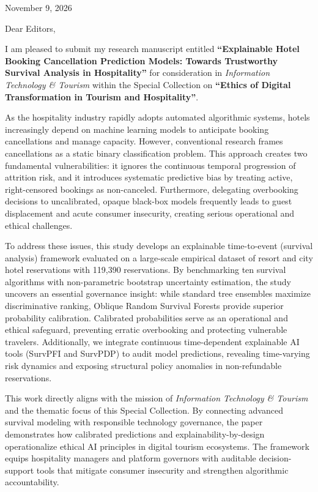 \documentclass[11pt,a4paper]{article}
\begin{document}
\begin{flushright}
    November 9, 2026
\end{flushright}

\vspace{0.3cm}

Dear Editors,

I am pleased to submit my research manuscript entitled \textbf{``Explainable Hotel Booking Cancellation Prediction Models: Towards Trustworthy Survival Analysis in Hospitality''} for consideration in \textit{Information Technology \& Tourism} within the Special Collection on \textbf{``Ethics of Digital Transformation in Tourism and Hospitality''}.

As the hospitality industry rapidly adopts automated algorithmic systems, hotels increasingly depend on machine learning models to anticipate booking cancellations and manage capacity. However, conventional research frames cancellations as a static binary classification problem. This approach creates two fundamental vulnerabilities: it ignores the continuous temporal progression of attrition risk, and it introduces systematic predictive bias by treating active, right-censored bookings as non-canceled. Furthermore, delegating overbooking decisions to uncalibrated, opaque black-box models frequently leads to guest displacement and acute consumer insecurity, creating serious operational and ethical challenges.

To address these issues, this study develops an explainable time-to-event (survival analysis) framework evaluated on a large-scale empirical dataset of resort and city hotel reservations with 119{,}390 reservations. By benchmarking ten survival algorithms with non-parametric bootstrap uncertainty estimation, the study uncovers an essential governance insight: while standard tree ensembles maximize discriminative ranking, Oblique Random Survival Forests provide superior probability calibration. Calibrated probabilities serve as an operational and ethical safeguard, preventing erratic overbooking and protecting vulnerable travelers. Additionally, we integrate continuous time-dependent explainable AI tools (SurvPFI and SurvPDP) to audit model predictions, revealing time-varying risk dynamics and exposing structural policy anomalies in non-refundable reservations.

This work directly aligns with the mission of \textit{Information Technology \& Tourism} and the thematic focus of this Special Collection. By connecting advanced survival modeling with responsible technology governance, the paper demonstrates how calibrated predictions and explainability-by-design operationalize ethical AI principles in digital tourism ecosystems. The framework equips hospitality managers and platform governors with auditable decision-support tools that mitigate consumer insecurity and strengthen algorithmic accountability.
\end{document}
